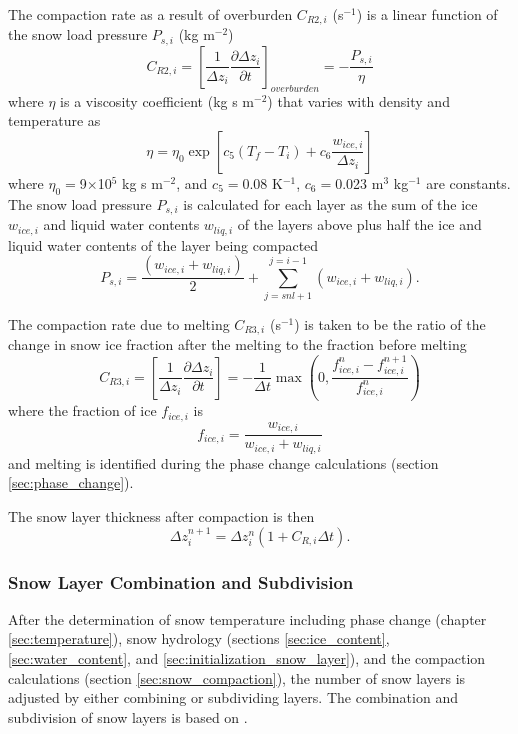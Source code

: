 \documentclass[12pt,authoryear]{elsarticle}
\numberwithin{equation}{section} %
\begin{document}
The compaction rate as a result of overburden $C_{R2,i}$ (s$^{-1}$) is a linear function of the snow load pressure $P_{s,i}$ (kg m$^{-2}$) \citep{andersonPointEnergyMass1976}
\begin{equation}
C_{R2,i}=\left[\frac{1}{\Delta z_{i}}\frac{\partial \Delta z_{i}}{\partial t}\right]_{overburden}=-\frac{P_{s,i}}{\eta}
\end{equation}
where $\eta$ is a viscosity coefficient (kg s m$^{-2}$) that varies with density and temperature as
\begin{equation}
\eta = \eta_{0}\exp \left[c_{5}(T_{f}-T_{i})+c_{6}\frac{w_{ice,i}}{\Delta z_{i}}\right]
\end{equation}
where $\eta_{0}=$9$\times$10$^5$ kg s m$^{-2}$, and $c_{5}=$0.08 K$^{-1}$, $c_{6}=$0.023 m$^{3}$ kg$^{-1}$ are constants. The
snow load pressure $P_{s,i}$ is calculated for each layer as the sum of the ice $w_{ice,i}$ and liquid water contents $w_{liq,i}$ of the layers above plus half the ice and liquid water contents of the layer being compacted 
\begin{equation}
P_{s,i}=\frac{(w_{ice,i}+w_{liq,i})}{2}+\sum_{j=snl+1}^{j=i-1}(w_{ice,i}+w_{liq,i}).
\end{equation}

The compaction rate due to melting $C_{R3,i}$ (s$^{-1}$) is taken to be the ratio of the change in snow ice fraction after the melting to the fraction before melting
\begin{equation}
C_{R3,i} = \left[\frac{1}{\Delta z_{i}}\frac{\partial \Delta z_{i}}{\partial t}\right]=-\frac{1}{\Delta t}\max\left(0,\frac{f_{ice,i}^{n}-f_{ice,i}^{n+1}}{f_{ice,i}^{n}}\right)
\end{equation}
where the fraction of ice $f_{ice,i}$ is
\begin{equation}
f_{ice,i} = \frac{w_{ice,i}}{w_{ice,i}+w_{liq,i}}
\end{equation}
and melting is identified during the phase change calculations (section \ref{sec:phase_change}).

The snow layer thickness after compaction is then
\begin{equation}
\Delta z_{i}^{n+1} = \Delta z_{i}^{n}(1+C_{R,i}\Delta t).
\end{equation}

\subsubsection{Snow Layer Combination and Subdivision}
\label{sec:snow_layer_combination_and_subdivision}
%
After the determination of snow temperature including phase change (chapter \ref{sec:temperature}), snow hydrology (sections \ref{sec:ice_content}, \ref{sec:water_content}, and \ref{sec:initialization_snow_layer}), and the compaction calculations (section \ref{sec:snow_compaction}), the number of snow layers is adjusted by either combining or subdividing layers. The combination and subdivision of snow layers is based on \cite{jordanOnedimensionalTemperatureModel1991}.
\end{document}
